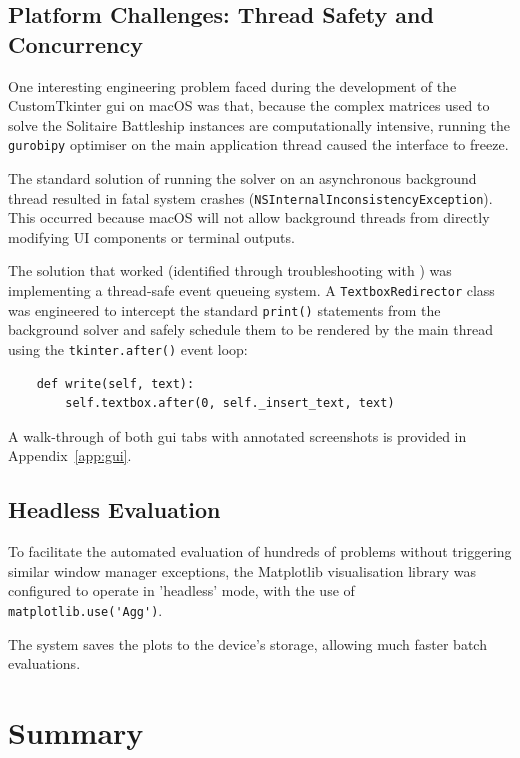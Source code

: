 \subsection{Platform Challenges: Thread Safety and Concurrency}\label{subsec:platform-challenges-thread-safety}
One interesting engineering problem faced during the development of the CustomTkinter \gls{gui} on macOS was that, because the complex matrices used to solve the Solitaire Battleship instances are computationally intensive, running the \verb|gurobipy| optimiser on the main application thread caused the interface to freeze. 

The standard solution of running the solver on an asynchronous background thread resulted in fatal system crashes (\verb|NSInternalInconsistencyException|). This occurred because macOS will not allow background threads from directly modifying UI components or terminal outputs.

The solution that worked (identified through troubleshooting with \citet{gemini}) was implementing a thread-safe event queueing system. A \verb|TextboxRedirector| class was engineered to intercept the standard \verb|print()| statements from the background solver and safely schedule them to be rendered by the main thread using the \verb|tkinter.after()| event loop:
\begin{verbatim}
    def write(self, text):
        self.textbox.after(0, self._insert_text, text)
\end{verbatim} 

A walk-through of both \gls{gui} tabs with annotated screenshots is provided in Appendix~\ref{app:gui}.

\subsection{Headless Evaluation}\label{subsec:headless-evaluation}
To facilitate the automated evaluation of hundreds of problems without triggering similar window manager exceptions, the Matplotlib visualisation library was configured to operate in 'headless' mode, with the use of \verb|matplotlib.use('Agg')|.

The system saves the plots to the device's storage, allowing much faster batch evaluations.

\section{Summary}\label{sec:summary}

